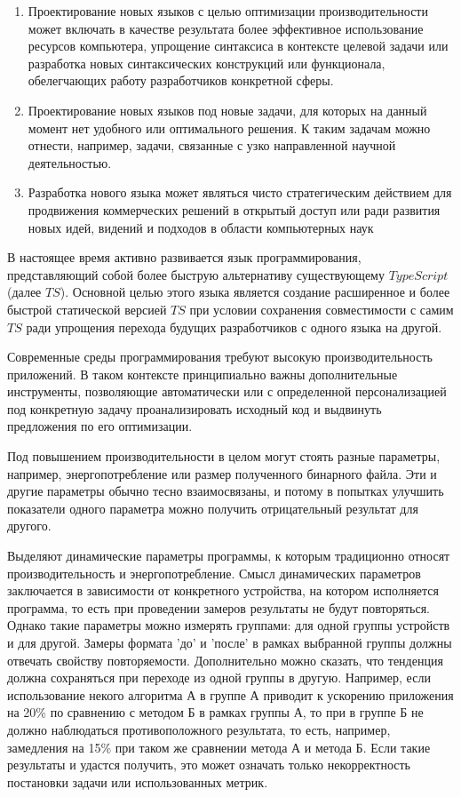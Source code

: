 \documentclass{mipt-thesis-bs}
\begin{document}
\begin{enumerate}
    \item Проектирование новых языков с целью оптимизации производительности
    может включать в качестве результата более эффективное использование
    ресурсов компьютера, упрощение синтаксиса в контексте целевой задачи
    или разработка новых синтаксических конструкций или функционала,
    обелегчающих работу разработчиков конкретной сферы.
    \item  Проектирование новых языков под новые задачи, для которых на данный
    момент нет удобного или оптимального решения. К таким задачам можно отнести,
    например, задачи, связанные с узко направленной научной деятельностью.
    \item Разработка нового языка может являться чисто стратегическим действием
    для продвижения коммерческих решений в открытый доступ или ради развития
    новых идей, видений и подходов в области компьютерных наук
\end{enumerate}

В настоящее время активно развивается язык программирования, представляющий собой
более быструю альтернативу существующему $TypeScript$ (далее $TS$). Основной целью этого языка
является создание расширенное и более быстрой статической версией $TS$ при
условии сохранения совместимости с самим $TS$ ради упрощения перехода будущих разработчиков
с одного языка на другой.

Современные среды программирования требуют высокую производительность приложений. В таком
контексте принципиально важны дополнительные инструменты, позволяющие автоматически или с
определенной персонализацией под конкретную задачу проанализировать исходный код и выдвинуть
предложения по его оптимизации.

Под повышением производительности в целом могут стоять разные параметры, например,
энергопотребление или размер полученного бинарного файла. Эти и другие параметры обычно
тесно взаимосвязаны, и потому в попытках улучшить показатели одного параметра можно получить
отрицательный результат для другого.

Выделяют динамические параметры программы, к которым традиционно относят производительность
и энергопотребление. Смысл динамических параметров заключается в зависимости от конкретного устройства,
на котором исполняется программа, то есть при проведении замеров результаты не будут повторяться.
Однако такие параметры можно измерять группами: для одной группы устройств и для другой.
Замеры формата 'до' и 'после' в рамках выбранной группы должны отвечать свойству повторяемости.
Дополнительно можно сказать, что тенденция должна сохраняться при переходе из одной группы в другую.
Например, если использование некого алгоритма А в группе А приводит к ускорению приложения на 20\% по
сравнению с методом Б в рамках группы А, то при в группе Б не должно наблюдаться противоположного результата,
то есть, например, замедления на 15\% при таком же сравнении метода А и метода Б. Если такие результаты и
удастся получить, это может означать только некорректность постановки задачи или использованных метрик.
\end{document}
